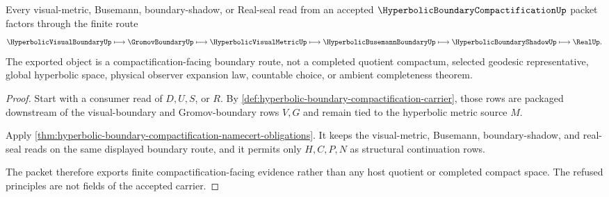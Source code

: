 \begin{theorem}
\label{thm:hyperbolic-boundary-compactification-visual-handoff}
Every visual-metric, Busemann, boundary-shadow, or Real-seal read from an accepted $\HyperbolicBoundaryCompactificationUp$ packet factors through the finite route
$$
\HyperbolicVisualBoundaryUp \longmapsto \GromovBoundaryUp \longmapsto \HyperbolicVisualMetricUp \longmapsto \HyperbolicBusemannBoundaryUp \longmapsto \HyperbolicBoundaryShadowUp \longmapsto \RealUp .
$$
The exported object is a compactification-facing boundary route, not a completed quotient compactum, selected geodesic representative, global hyperbolic space, physical observer expansion law, countable choice, or ambient completeness theorem.
\end{theorem}
\begin{proof}
Start with a consumer read of $D,U,S$, or $R$. By \autoref{def:hyperbolic-boundary-compactification-carrier}, those rows are packaged downstream of the visual-boundary and Gromov-boundary rows $V,G$ and remain tied to the hyperbolic metric source $M$.

Apply \autoref{thm:hyperbolic-boundary-compactification-namecert-obligations}. It keeps the visual-metric, Busemann, boundary-shadow, and real-seal reads on the same displayed boundary route, and it permits only $H,C,P,N$ as structural continuation rows.

The packet therefore exports finite compactification-facing evidence rather than any host quotient or completed compact space. The refused principles are not fields of the accepted carrier.
\end{proof}



